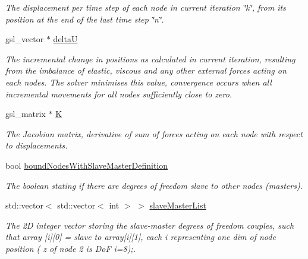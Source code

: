 \begin{DoxyCompactItemize}
\begin{DoxyCompactList}\small\item\em The displacement per time step of each node in current iteration \char`\"{}k\char`\"{}, from its position at the end of the last time step \char`\"{}n\char`\"{}. \end{DoxyCompactList}\item 
\hypertarget{classNewtonRaphsonSolver_a064de5e752631defb9dc1b33d5c115f2}{}gsl\+\_\+vector $\ast$ \hyperlink{classNewtonRaphsonSolver_a064de5e752631defb9dc1b33d5c115f2}{delta\+U}\label{classNewtonRaphsonSolver_a064de5e752631defb9dc1b33d5c115f2}

\begin{DoxyCompactList}\small\item\em The incremental change in positions as calculated in current iteration, resulting from the imbalance of elastic, viscous and any other external forces acting on each nodes. The solver minimises this value, convergence occurs when all incremental movements for all nodes sufficiently close to zero. \end{DoxyCompactList}\item 
\hypertarget{classNewtonRaphsonSolver_a4e9ffc424dd37c6c00f9de3d7ac455ed}{}gsl\+\_\+matrix $\ast$ \hyperlink{classNewtonRaphsonSolver_a4e9ffc424dd37c6c00f9de3d7ac455ed}{K}\label{classNewtonRaphsonSolver_a4e9ffc424dd37c6c00f9de3d7ac455ed}

\begin{DoxyCompactList}\small\item\em The Jacobian matrix, derivative of sum of forces acting on each node with respect to displacements. \end{DoxyCompactList}\item 
\hypertarget{classNewtonRaphsonSolver_ac00970bee6f2c4e1ed503e9c8df65e6d}{}bool \hyperlink{classNewtonRaphsonSolver_ac00970bee6f2c4e1ed503e9c8df65e6d}{bound\+Nodes\+With\+Slave\+Master\+Definition}\label{classNewtonRaphsonSolver_ac00970bee6f2c4e1ed503e9c8df65e6d}

\begin{DoxyCompactList}\small\item\em The boolean stating if there are degrees of freedom slave to other nodes (masters). \end{DoxyCompactList}\item 
\hypertarget{classNewtonRaphsonSolver_a08e76823173b89fe71fac26ba4edc191}{}std\+::vector$<$ std\+::vector$<$ int $>$ $>$ \hyperlink{classNewtonRaphsonSolver_a08e76823173b89fe71fac26ba4edc191}{slave\+Master\+List}\label{classNewtonRaphsonSolver_a08e76823173b89fe71fac26ba4edc191}

\begin{DoxyCompactList}\small\item\em The 2\+D integer vector storing the slave-\/master degrees of freedom couples, such that array \mbox{[}i\mbox{]}\mbox{[}0\mbox{]} = slave to array\mbox{[}i\mbox{]}\mbox{[}1\mbox{]}, each i representing one dim of node position ( z of node 2 is Do\+F i=8);. \end{DoxyCompactList}\end{DoxyCompactItemize}


